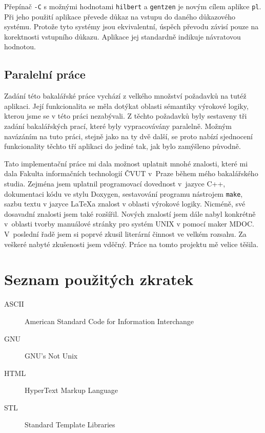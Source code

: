 \documentclass[thesis=B,czech,hidelinks]{thesis}[2012/06/26]
\begin{document}
Přepínač \texttt{-C} s možnými hodnotami \texttt{hilbert} a \texttt{gentzen} je novým cílem aplikce \texttt{pl}. Při jeho použití aplikace převede důkaz na vstupu do daného důkazového systému. Protože tyto systémy jsou ekvivalentní, úspěch převodu závisí pouze na korektnosti vstupního důkazu. Aplikace jej standardně indikuje návratovou hodnotou.

\section{Paralelní práce}

Zadání této bakalářské práce vychází z velkého množství požadavků na tutéž aplikaci. Její funkcionalita se měla dotýkat oblasti sémantiky výrokové logiky, kterou jsme se v této práci nezabývali. Z těchto požadavků byly sestaveny tři zadání bakalářských prací, které byly vypracovávány paralelně. Možným navázáním na tuto práci, stejně jako na ty dvě další, se proto nabízí sjednocení funkcionality těchto tří aplikaci do jediné tak, jak bylo zamýšleno původně.

%
%
%

\begin{conclusion}
Tato implementační práce mi dala možnost uplatnit mnohé znalosti, které mi dala Fakulta informačních technologií ČVUT v~Praze během mého bakalářského studia. Zejména jsem uplatnil programovací dovednost v~jazyce C++, dokumentaci kódu ve stylu Doxygen, sestavování programu nástrojem \texttt{make}, sazbu textu v jazyce \LaTeX a znalost v oblasti výrokové logiky. Nicméně, své dosavadní znalosti jsem také rozšířil. Nových znalostí jsem dále nabyl konkrétně v~oblasti tvorby manuálové stránky pro systém UNIX v pomocí maker MDOC. V~poslední řadě jsem si poprvé zkusil literární činnost ve velkém rozsahu. Za veškeré nabyté zkušenosti jsem vděčný. Práce na tomto projektu mě velice těšila.
\end{conclusion}

%
%
%




\appendix

%
%
%

\chapter{Seznam použitých zkratek}

\begin{description}
	\item[ASCII] American Standard Code for Information Interchange
	\item[GNU] GNU's Not Unix
	\item[HTML] HyperText Markup Language
	\item[STL] Standard Template Libraries
\end{description}
\end{document}
